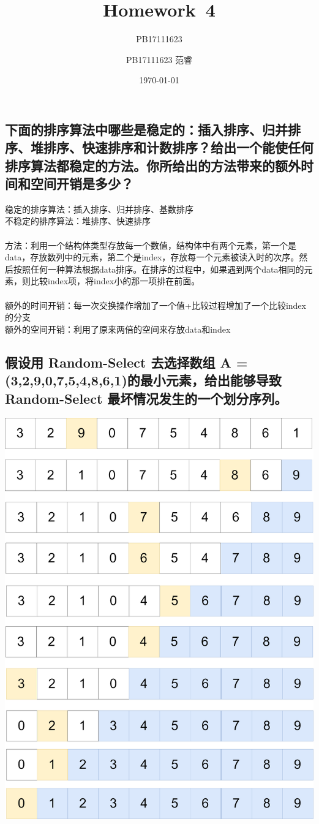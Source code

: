 \documentclass[UTF8]{ctexart}
\title{Homework\ 4}
\author{PB17111623}
\author{PB17111623 范睿}
\date{\today}
\begin{document}
\maketitle
\section{}
\subsection{下面的排序算法中哪些是稳定的：插入排序、归并排序、堆排序、快速排序和计数排序？给出一个能使任何排序算法都稳定的方法。你所给出的方法带来的额外时间和空间开销是多少？}
稳定的排序算法：插入排序、归并排序、基数排序\\
不稳定的排序算法：堆排序、快速排序\\\\
方法：利用一个结构体类型存放每一个数值，结构体中有两个元素，第一个是data，存放数列中的元素，第二个是index，存放每一个元素被读入时的次序。然后按照任何一种算法根据data排序。在排序的过程中，如果遇到两个data相同的元素，则比较index项，将index小的那一项排在前面。\\\\额外的时间开销：每一次交换操作增加了一个值+比较过程增加了一个比较index的分支\\
额外的空间开销：利用了原来两倍的空间来存放data和index
\subsection{假设用 Random-Select 去选择数组 A = (3,2,9,0,7,5,4,8,6,1)的最小元素，给出能够导致Random-Select 最坏情况发生的一个划分序列。}
\includegraphics[scale=0.2]{img/partition.png}
\end{document}
